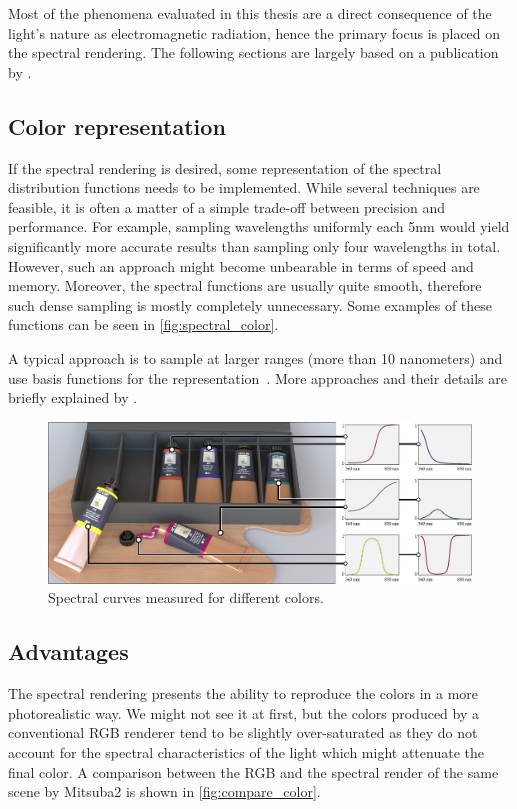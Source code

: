 Most of the phenomena evaluated in this thesis are a direct consequence of the light's nature as electromagnetic radiation, hence the primary focus is placed on the spectral rendering.
The following sections are largely based on a publication by \citet{wilkie2002tone}.

\subsection{Color representation}

If the spectral rendering is desired, some representation of the spectral distribution functions needs to be implemented. While several techniques are feasible, it is often a matter of a simple trade-off between precision and performance. For example, sampling wavelengths uniformly each 5nm would yield significantly more accurate results than sampling only four wavelengths in total. However, such an approach might become unbearable in terms of speed and memory. Moreover, the spectral functions are usually quite smooth, therefore such dense sampling is mostly completely unnecessary. Some examples of these functions can be seen in \autoref{fig:spectral_color}.

A typical approach is to sample at larger ranges (more than 10 nanometers) and use basis functions for the representation~\cite{peercy1993linear}. More approaches and their details are briefly explained by \citet{wilkie2002tone}.

\begin{figure}[httpb]
	\centering
	\includegraphics[width=.9\linewidth]{img/spectral_color.jpg}
	\caption{Spectral curves measured for different colors\cite{jakob2019low}.}
	\label{fig:spectral_color}
\end{figure}

\subsection{Advantages}

The spectral rendering presents the ability to reproduce the colors in a more photorealistic way. We might not see it at first, but the colors produced by a conventional RGB renderer tend to be slightly over-saturated as they do not account for the spectral characteristics of the light which might attenuate the final color. A comparison between the RGB and the spectral render of the same scene by Mitsuba2 is shown in \autoref{fig:compare_color}.

